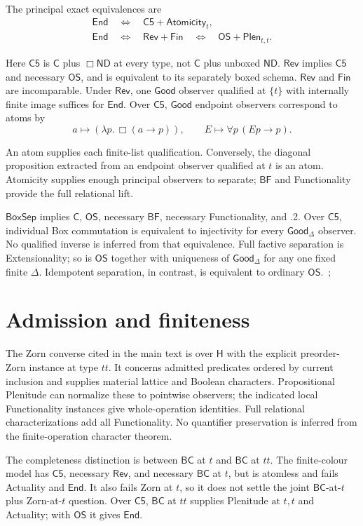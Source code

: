 \documentclass[12pt,letterpaper]{article}
\newcommand{\Hlogic}{\mathsf{H}}
\newcommand{\C}{\mathsf{C}}
\newcommand{\Cfive}{\mathsf{C5}}
\newcommand{\BF}{\mathsf{BF}}
\newcommand{\OS}{\mathsf{OS}}
\newcommand{\Good}{\mathsf{Good}}
\newcommand{\End}{\mathsf{End}}
\newcommand{\Rev}{\mathsf{Rev}}
\newcommand{\Fin}{\mathsf{Fin}}
\newcommand{\BoxSep}{\mathsf{BoxSep}}
\newcommand{\Plen}{\mathsf{Plen}}
\newcommand{\At}{\mathsf{Atomicity}}
\newcommand{\ND}{\mathsf{ND}}
\newcommand{\BC}{\mathsf{BC}}
\begin{document}
The principal exact equivalences are
\begin{gather*}
\End\quad\Longleftrightarrow\quad\Cfive+\At_t,\\
\End\quad\Longleftrightarrow\quad\Rev+\Fin\quad\Longleftrightarrow\quad\OS+\Plen_{t,t}.
\end{gather*}

Here $\Cfive$ is $\C$ plus $\Box\ND$ at every type, not $\C$ plus unboxed $\ND$. $\Rev$ implies $\Cfive$ and necessary $\OS$, and is equivalent to its separately boxed schema. $\Rev$ and $\Fin$ are incomparable. Under $\Rev$, one $\Good$ observer qualified at $\{t\}$ with internally finite image suffices for $\End$. Over $\Cfive$, $\Good$ endpoint observers correspond to atoms by
\[
a\longmapsto(\lambda p.\,\Box(a\to p)),\qquad E\longmapsto\forall p\,(Ep\to p).
\]

An atom supplies each finite-list qualification. Conversely, the diagonal proposition extracted from an endpoint observer qualified at $t$ is an atom. Atomicity supplies enough principal observers to separate; $\BF$ and Functionality provide the full relational lift.~\cite[\S\S3--6]{r9}


$\BoxSep$ implies $\C$, $\OS$, necessary $\BF$, necessary Functionality, and .2. Over $\Cfive$, individual Box commutation is equivalent to injectivity for every $\Good_\Delta$ observer. No qualified inverse is inferred from that equivalence. Full factive separation is Extensionality; so is $\OS$ together with uniqueness of $\Good_\Delta$ for any one fixed finite $\Delta$. Idempotent separation, in contrast, is equivalent to ordinary $\OS$.~\cite[\S\S2, 8]{r9};~\cite{r10}


\section{Admission and finiteness}

The Zorn converse cited in the main text is over $\Hlogic$ with the explicit preorder-Zorn instance at type $tt$. It concerns admitted predicates ordered by current inclusion and supplies material lattice and Boolean characters. Propositional Plenitude can normalize these to pointwise observers; the indicated local Functionality instances give whole-operation identities. Full relational characterizations add all Functionality. No quantifier preservation is inferred from the finite-operation character theorem.~\cite[\S\S1--6]{r7}


The completeness distinction is between $\BC$ at $t$ and $\BC$ at $tt$. The finite-colour model has $\Cfive$, necessary $\Rev$, and necessary $\BC$ at $t$, but is atomless and fails Actuality and $\End$. It also fails Zorn at $t$, so it does not settle the joint $\BC$-at-$t$ plus Zorn-at-$t$ question. Over $\Cfive$, $\BC$ at $tt$ supplies Plenitude $\text{at }t,t$ and Actuality; with $\OS$ it gives $\End$.~\cite[\S\S4, 6]{r13}
\end{document}
